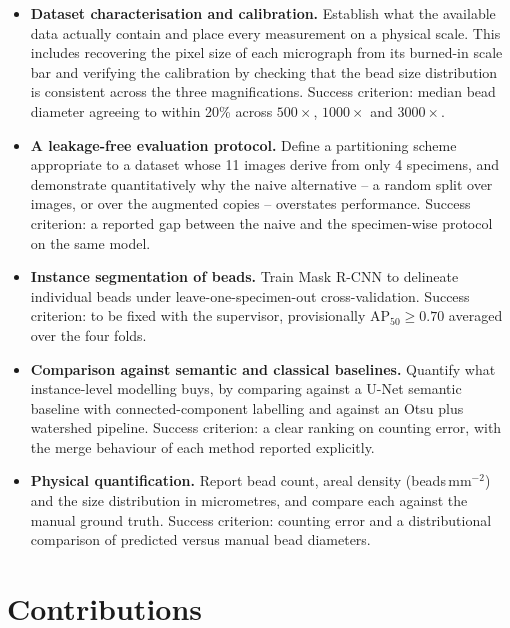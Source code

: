 \begin{itemize}
    \item \textbf{Dataset characterisation and calibration.} Establish what the
    available data actually contain and place every measurement on a physical scale.
    This includes recovering the pixel size of each micrograph from its burned-in
    scale bar and verifying the calibration by checking that the bead size
    distribution is consistent across the three magnifications. Success criterion:
    median bead diameter agreeing to within 20\% across $500\times$, $1000\times$ and
    $3000\times$.

    \item \textbf{A leakage-free evaluation protocol.} Define a partitioning scheme
    appropriate to a dataset whose 11 images derive from only 4 specimens, and
    demonstrate quantitatively why the naive alternative -- a random split over
    images, or over the augmented copies -- overstates performance. Success criterion:
    a reported gap between the naive and the specimen-wise protocol on the same model.

    \item \textbf{Instance segmentation of beads.} Train Mask R-CNN to delineate
    individual beads under leave-one-specimen-out cross-validation.
    Success criterion: to be fixed with the supervisor, provisionally
    $\mathrm{AP}_{50} \geq 0.70$ averaged over the four folds.

    \item \textbf{Comparison against semantic and classical baselines.} Quantify what
    instance-level modelling buys, by comparing against a U-Net
    \cite{ronneberger2015unet} semantic baseline with connected-component labelling
    and against an Otsu \cite{otsu1979threshold} plus watershed
    \cite{vincent1991watersheds} pipeline. Success criterion: a clear ranking on
    counting error, with the merge behaviour of each method reported explicitly.

    \item \textbf{Physical quantification.} Report bead count, areal density
    (beads\,mm$^{-2}$) and the size distribution in micrometres, and compare each
    against the manual ground truth. Success criterion: counting error and a
    distributional comparison of predicted versus manual bead diameters.
\end{itemize}

\section{Contributions}

